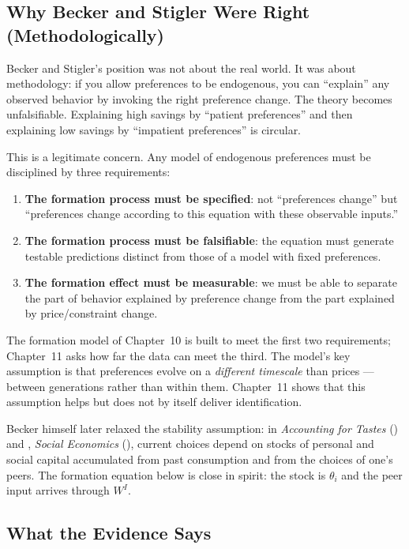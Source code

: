 \documentclass[../structural_economics_book.tex]{subfiles}
\begin{document}
\subsection{Why Becker and Stigler Were Right (Methodologically)}

Becker and Stigler's position was not about the real world. It was about methodology: if you allow preferences to be endogenous, you can ``explain'' any observed behavior by invoking the right preference change. The theory becomes unfalsifiable. Explaining high savings by ``patient preferences'' and then explaining low savings by ``impatient preferences'' is circular.

This is a legitimate concern. Any model of endogenous preferences must be disciplined by three requirements:
\begin{enumerate}
\item \textbf{The formation process must be specified}: not ``preferences change'' but ``preferences change according to this equation with these observable inputs.''
\item \textbf{The formation process must be falsifiable}: the equation must generate testable predictions distinct from those of a model with fixed preferences.
\item \textbf{The formation effect must be measurable}: we must be able to separate the part of behavior explained by preference change from the part explained by price/constraint change.
\end{enumerate}

The formation model of Chapter~10 is built to meet the first two requirements; Chapter~11 asks how far the data can meet the third. The model's key assumption is that preferences evolve on a \textit{different timescale} than prices --- between generations rather than within them. Chapter~11 shows that this assumption helps but does not by itself deliver identification.

Becker himself later relaxed the stability assumption: in \textit{Accounting for Tastes} (\citeyear{becker1996accounting}) and \citeauthor{becker2000social}, \textit{Social Economics} (\citeyear{becker2000social}), current choices depend on stocks of personal and social capital accumulated from past consumption and from the choices of one's peers. The formation equation below is close in spirit: the stock is $\theta_i$ and the peer input arrives through $W^I$.


\subsection{What the Evidence Says}
\end{document}
